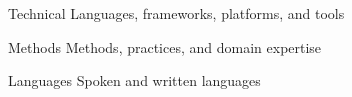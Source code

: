 

\begin{cvskills}

  \cvskill
    {Technical} %
    {Languages, frameworks, platforms, and tools}

  \cvskill
    {Methods} %
    {Methods, practices, and domain expertise}

  \cvskill
    {Languages} %
    {Spoken and written languages}

\end{cvskills}
